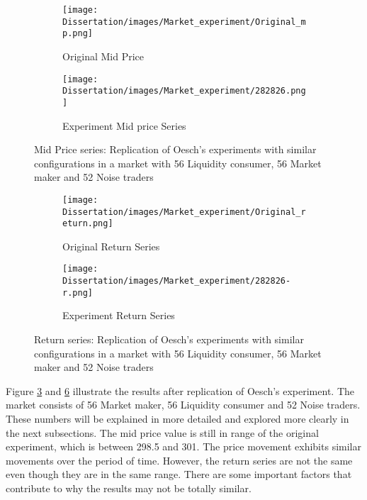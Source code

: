 \begin{figure}[h]
  \begin{subfigure}[b]{0.5\textwidth}
    \texttt{[image: Dissertation/images/Market\_experiment/Original\_mp.png]}
    \caption{Original Mid Price \cite{Oesch}}
    \label{fig:O_original_mp}
  \end{subfigure}
  \begin{subfigure}[b]{0.5\textwidth}
    \texttt{[image: Dissertation/images/Market\_experiment/282826.png]}
    \caption{Experiment Mid price Series}
    \label{fig:O_experiment_mp}
  \end{subfigure}
\caption{Mid Price series: Replication of Oesch's experiments with similar configurations in a market with 56 Liquidity consumer, 56 Market maker and 52 Noise traders} 
\label{fig:Oesch_mp}
\end{figure}

\begin{figure}[h]
  \begin{subfigure}[b]{0.5\textwidth}
    \texttt{[image: Dissertation/images/Market\_experiment/Original\_return.png]}
    \caption{Original Return Series \cite{Oesch}}
    \label{fig:O_original_return}
  \end{subfigure}
  \begin{subfigure}[b]{0.5\textwidth}
    \texttt{[image: Dissertation/images/Market\_experiment/282826-r.png]}
    \caption{Experiment Return Series}
    \label{fig:O_experiment_return}
  \end{subfigure}
\caption{Return series: Replication of Oesch's experiments with similar configurations in a market with 56 Liquidity consumer, 56 Market maker and 52 Noise traders } 
\label{fig:Oesch_return}
\end{figure}
\FloatBarrier

Figure \ref{fig:Oesch_mp} and \ref{fig:Oesch_return} illustrate the results after replication of Oesch's experiment. The market consists of 56 Market maker, 56 Liquidity consumer and 52 Noise traders. These numbers will be explained in more detailed and explored more clearly in the next subsections. The mid price value is still in range of the original experiment, which is between 298.5 and 301. The price movement exhibits similar movements over the period of time. However, the return series are not the same even though they are in the same range. There are some important factors that contribute to why the results may not be totally similar. 

